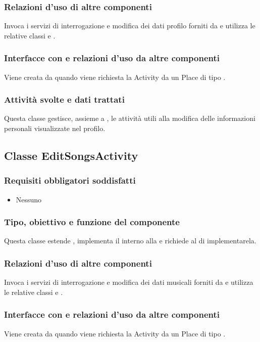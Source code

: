 \subsubsection*{Relazioni d'uso di altre componenti}
Invoca i servizi di interrogazione e modifica dei dati profilo forniti da
 e utilizza le relative classi  e
.
\subsubsection*{Interfacce con e relazioni d'uso da altre componenti}
Viene creata da  quando viene richiesta la Activity da
un Place di tipo .
\subsubsection*{Attivit\`a svolte e dati trattati}
Questa classe gestisce, assieme a , le attivit\`a utili alla
modifica delle informazioni personali visualizzate nel profilo.

\subsection{Classe EditSongsActivity}
\subsubsection*{Requisiti obbligatori soddisfatti}
\begin{itemize}
    \item Nessuno
\end{itemize}
\subsubsection*{Tipo, obiettivo e funzione del componente}
Questa classe estende , implementa il 
interno alla  e richiede al  di
implementarela.
\subsubsection*{Relazioni d'uso di altre componenti} Invoca i servizi di
interrogazione e modifica dei dati musicali forniti da  e
utilizza le relative classi  e .
\subsubsection*{Interfacce con e relazioni d'uso da altre componenti}
Viene creata da  quando viene richiesta la Activity da
un Place di tipo .
